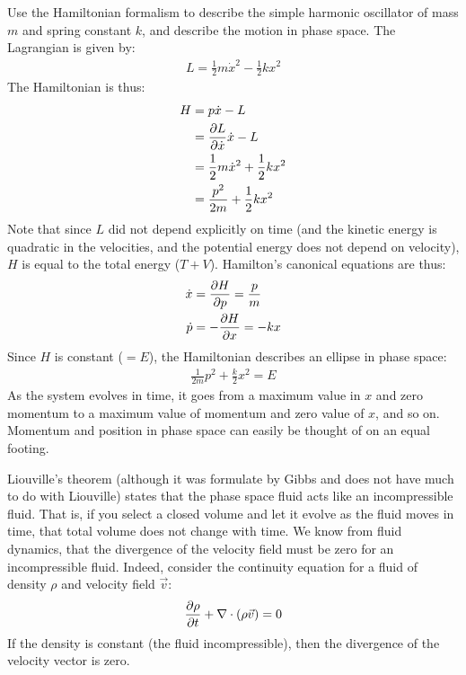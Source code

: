 \begin{example}{0pt}{Use the Hamiltonian formalism to describe the simple harmonic oscillator of mass $m$ and spring constant $k$, and describe the motion in phase space.}{}
The Lagrangian is given by:
\begin{align*}
L=\frac{1}{2}m\dot x^2-\frac{1}{2}kx^2
\end{align*}
The Hamiltonian is thus:
\begin{align*}
H&=p\dot x -L\\
 &= \frac{\partial L}{\partial \dot x} \dot x -L\\
 &=\frac{1}{2}m\dot x^2 + \frac{1}{2}kx^2\\
 &=\frac{p^2}{2m}+\frac{1}{2}kx^2
\end{align*}
Note that since $L$ did not depend explicitly on time (and the kinetic energy is quadratic in the velocities, and the potential energy does not depend on velocity), $H$ is equal to the total energy ($T+V$). Hamilton's canonical equations are thus:
\begin{align*}
\dot x&=\frac{\partial H}{\partial p} =\frac{p}{m}\\
\dot p &= -\frac{\partial H}{\partial x}=-kx
\end{align*}
Since $H$ is constant ($=E$), the Hamiltonian describes an ellipse in phase space:
\begin{align}
\frac{1}{2m}p^2+\frac{k}{2}x^2=E
\end{align}
As the system evolves in time, it goes from a maximum value in $x$ and zero momentum to a maximum value of momentum and zero value of $x$, and so on. Momentum and position in phase space can easily be thought of on an equal footing.
\end{example}

Liouville's theorem (although it was formulate by Gibbs and does not have much to do with Liouville) states that the phase space fluid acts like an incompressible fluid. That is, if you select a closed volume and let it evolve as the fluid moves in time, that total volume does not change with time. We know from fluid dynamics, that the divergence of the velocity field must be zero for an incompressible fluid. Indeed, consider the continuity equation for a fluid of density $\rho$ and velocity field $\vec v$:
\begin{align}
\frac{\partial \rho}{\partial t}+\nabla\cdot(\rho \vec v)=0
\end{align}
If the density is constant (the fluid incompressible), then the divergence of the velocity vector is zero.

